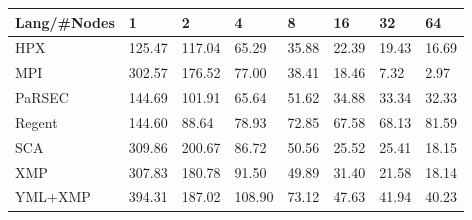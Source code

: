 \begin{tabularx}{\textwidth}{CCCCCCCC}
Lang/#Nodes& 1 & 2 & 4 & 8 & 16 & 32 & 64 \\ \hline
HPX & 125.47 & 117.04 & 65.29 & 35.88 & 22.39 & 19.43 & 16.69 \\
MPI & 302.57 & 176.52 & 77.00 & 38.41 & 18.46 & 7.32 & 2.97 \\
PaRSEC & 144.69 & 101.91 & 65.64 & 51.62 & 34.88 & 33.34 & 32.33 \\
Regent & 144.60 & 88.64 & 78.93 & 72.85 & 67.58 & 68.13 & 81.59 \\
SCA & 309.86 & 200.67 & 86.72 & 50.56 & 25.52 & 25.41 & 18.15 \\
XMP & 307.83 & 180.78 & 91.50 & 49.89 & 31.40 & 21.58 & 18.14 \\
YML+XMP & 394.31 & 187.02 & 108.90 & 73.12 & 47.63 & 41.94 & 40.23 \\
\hline
\end{tabularx}
